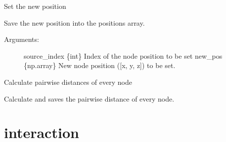 \documentclass[letterpaper,10pt,english]{sphinxmanual}
\begin{document}
\begin{fulllineitems}

\begin{fulllineitems}
\label{\detokenize{index:environment.Environment.set_pos}}
Set the new position

Save the new position into the positions array.
\begin{description}
\item[{Arguments:}] \leavevmode
source\_index \{int\} \textendash{} Index of the node position to be set
new\_pos \{np.array\} \textendash{} New node position ({[}x, y, z{]}) to be set.

\end{description}

\end{fulllineitems}


\begin{fulllineitems}
\label{\detokenize{index:environment.Environment.update_distance}}
Calculate pairwise distances of every node

Calculate and saves the pairwise distance of every node.

\end{fulllineitems}


\end{fulllineitems}



\chapter{interaction}
\label{\detokenize{index:module-interaction}}\label{\detokenize{index:interaction}}
\end{document}
